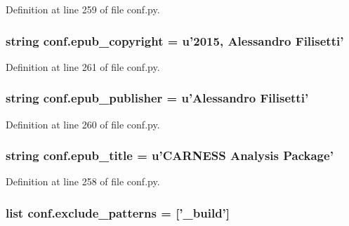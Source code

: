 Definition at line 259 of file conf.\-py.

\hypertarget{a00101_a443008520a058a726d07c6b5ccf45366}{
\subsubsection[{epub\-\_\-copyright}]{\setlength{\rightskip}{0pt plus 5cm}string conf.\-epub\-\_\-copyright = u'2015, Alessandro Filisetti'}}\label{a00101_a443008520a058a726d07c6b5ccf45366}


Definition at line 261 of file conf.\-py.

\hypertarget{a00101_a13c40319d84c9383e0d119773cc1ed02}{
\subsubsection[{epub\-\_\-publisher}]{\setlength{\rightskip}{0pt plus 5cm}string conf.\-epub\-\_\-publisher = u'Alessandro Filisetti'}}\label{a00101_a13c40319d84c9383e0d119773cc1ed02}


Definition at line 260 of file conf.\-py.

\hypertarget{a00101_a9e0d62d22b83ce34deb3f16ba63cedfe}{
\subsubsection[{epub\-\_\-title}]{\setlength{\rightskip}{0pt plus 5cm}string conf.\-epub\-\_\-title = u'C\-A\-R\-N\-E\-S\-S Analysis Package'}}\label{a00101_a9e0d62d22b83ce34deb3f16ba63cedfe}


Definition at line 258 of file conf.\-py.

\hypertarget{a00101_a7ad48fb6f3e9b129c02346ea0d3527c1}{
\subsubsection[{exclude\-\_\-patterns}]{\setlength{\rightskip}{0pt plus 5cm}list conf.\-exclude\-\_\-patterns = \mbox{[}'\-\_\-build'\mbox{]}}}\label{a00101_a7ad48fb6f3e9b129c02346ea0d3527c1}



